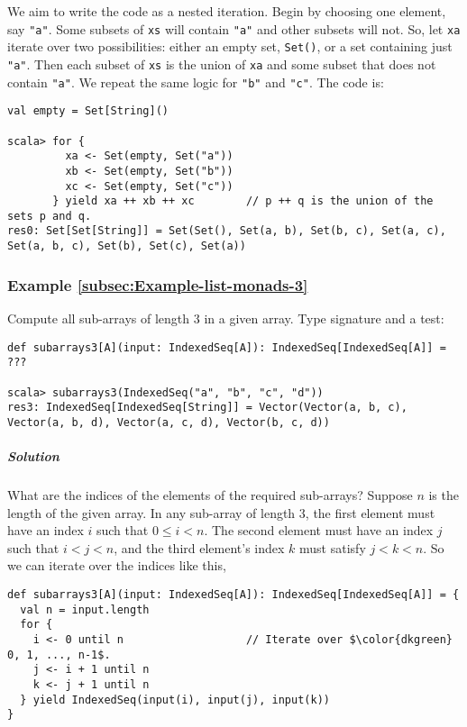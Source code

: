 We aim to write the code as a nested iteration. Begin by choosing
one element, say \lstinline!"a"!. Some subsets of \lstinline!xs!
will contain \lstinline!"a"! and other subsets will not. So, let
\lstinline!xa! iterate over two possibilities: either an empty set,
\lstinline!Set()!, or a set containing just \lstinline!"a"!. Then
each subset of \lstinline!xs! is the union of \lstinline!xa! and
some subset that does not contain \lstinline!"a"!. We repeat the
same logic for \lstinline!"b"! and \lstinline!"c"!. The code is:
\begin{lstlisting}
val empty = Set[String]()

scala> for {
         xa <- Set(empty, Set("a"))
         xb <- Set(empty, Set("b"))
         xc <- Set(empty, Set("c"))
       } yield xa ++ xb ++ xc        // p ++ q is the union of the sets p and q.
res0: Set[Set[String]] = Set(Set(), Set(a, b), Set(b, c), Set(a, c), Set(a, b, c), Set(b), Set(c), Set(a))
\end{lstlisting}


\subsubsection{Example \label{subsec:Example-list-monads-3}\ref{subsec:Example-list-monads-3}}

Compute all sub-arrays of length $3$ in a given array. Type signature
and a test:
\begin{lstlisting}
def subarrays3[A](input: IndexedSeq[A]): IndexedSeq[IndexedSeq[A]] = ???

scala> subarrays3(IndexedSeq("a", "b", "c", "d"))
res3: IndexedSeq[IndexedSeq[String]] = Vector(Vector(a, b, c), Vector(a, b, d), Vector(a, c, d), Vector(b, c, d))
\end{lstlisting}


\subparagraph{Solution}

What are the indices of the elements of the required sub-arrays? Suppose
$n$ is the length of the given array. In any sub-array of length
$3$, the first element must have an index $i$ such that $0\leq i<n$.
The second element must have an index $j$ such that $i<j<n$, and
the third element\textsf{'}s index $k$ must satisfy $j<k<n$. So we can iterate
over the indices like this,
\begin{lstlisting}[mathescape=true]
def subarrays3[A](input: IndexedSeq[A]): IndexedSeq[IndexedSeq[A]] = {
  val n = input.length
  for {
    i <- 0 until n                   // Iterate over $\color{dkgreen} 0, 1, ..., n-1$.
    j <- i + 1 until n
    k <- j + 1 until n
  } yield IndexedSeq(input(i), input(j), input(k))
}
\end{lstlisting}


